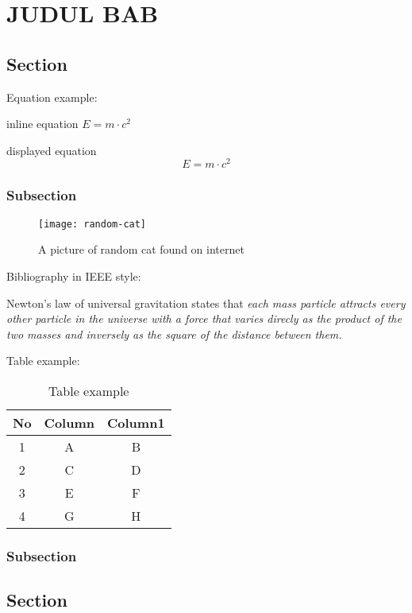 \chapter{JUDUL BAB}
\section{Section}
\lipsum[1]
Equation example:

inline equation $E=m\cdot c^2$

displayed equation
\begin{equation}
    E=m\cdot c^2
\end{equation}
\subsection{Subsection}
\begin{figure}[H]
    \centering
    \texttt{[image: random-cat]}
    \caption{A picture of random cat found on internet}\label{random-cat}
\end{figure}

Bibliography in IEEE style:

Newton's law of universal gravitation states that \textit{each mass particle attracts every other particle in the universe with a force that varies direcly as the product of the two masses and inversely as the square of the distance between them.}\cite{book:classical}

Table example:

\begin{table}[H]
    \centering
    \caption{Table example}\label{table1}
    \begin{tabular}{ccc}
        \toprule
        No & Column & Column1 \\
        \midrule
        1  & A      & B       \\
        2  & C      & D       \\
        3  & E      & F       \\
        4  & G      & H       \\
        \bottomrule
    \end{tabular}
\end{table}

\lipsum[1]
\subsection{Subsection}
\lipsum[1]
\section{Section}
\lipsum[2]
